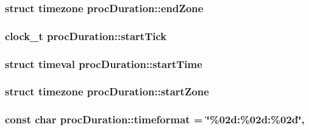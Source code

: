 \hypertarget{classprocDuration_a3f2c2451dc709af15bd6bf65b3308be4}{
\subsubsection[{end\-Zone}]{\setlength{\rightskip}{0pt plus 5cm}struct timezone proc\-Duration\-::end\-Zone\hspace{0.3cm}{\ttfamily [protected]}}}\label{classprocDuration_a3f2c2451dc709af15bd6bf65b3308be4}
\hypertarget{classprocDuration_a6305985898bc3c56d96bbbd315dce3d2}{
\subsubsection[{start\-Tick}]{\setlength{\rightskip}{0pt plus 5cm}clock\-\_\-t proc\-Duration\-::start\-Tick\hspace{0.3cm}{\ttfamily [protected]}}}\label{classprocDuration_a6305985898bc3c56d96bbbd315dce3d2}
\hypertarget{classprocDuration_a1f7a4f39023ba5f5786644e91f03ab7d}{
\subsubsection[{start\-Time}]{\setlength{\rightskip}{0pt plus 5cm}struct timeval proc\-Duration\-::start\-Time\hspace{0.3cm}{\ttfamily [protected]}}}\label{classprocDuration_a1f7a4f39023ba5f5786644e91f03ab7d}
\hypertarget{classprocDuration_a3a5ebfdf4aaaa8dacefefab93ef1ce40}{
\subsubsection[{start\-Zone}]{\setlength{\rightskip}{0pt plus 5cm}struct timezone proc\-Duration\-::start\-Zone\hspace{0.3cm}{\ttfamily [protected]}}}\label{classprocDuration_a3a5ebfdf4aaaa8dacefefab93ef1ce40}
\hypertarget{classprocDuration_a4f6bdff03e812b65c2c68e4d33f55d8c}{
\subsubsection[{timeformat}]{\setlength{\rightskip}{0pt plus 5cm}const char proc\-Duration\-::timeformat = \char`\"{}\%02d\-:\%02d\-:\%02d\char`\"{}\hspace{0.3cm}{\ttfamily [static]}, {\ttfamily [protected]}}}\label{classprocDuration_a4f6bdff03e812b65c2c68e4d33f55d8c}
